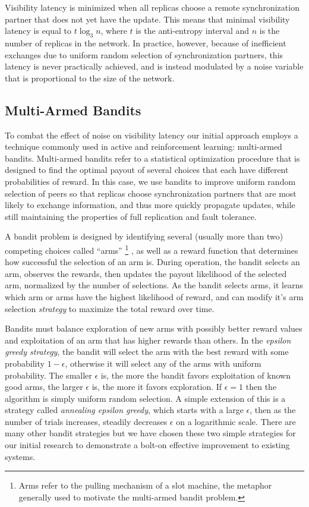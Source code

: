 Visibility latency is minimized when all replicas choose a remote
synchronization partner that does not yet have the update.
This means that minimal visibility latency is equal to $t\log_3n$, where
$t$ is the anti-entropy interval and $n$ is the number of replicas in the
network.
In practice, however, because of inefficient exchanges due to uniform random
selection of synchronization partners, this latency is never practically
achieved, and is instead modulated by a noise variable that is
proportional to the size of the network.

\subsection{Multi-Armed Bandits}

To combat the effect of noise on visibility latency our initial approach
employs a technique commonly used in active and reinforcement learning:
multi-armed bandits.
Multi-armed bandits refer to a statistical optimization procedure that is
designed to find the optimal payout of several choices that each have
different probabilities of reward.
In this case, we use bandits to improve uniform random selection of peers so
that replicas choose synchronization partners that are most likely to exchange
information, and thus more quickly propagate updates, while still maintaining
the properties of full replication and fault tolerance.

A bandit problem is designed by identifying several (usually more than two)
competing choices called ``arms''\renewcommand{\baselinestretch}{1} \small\footnotesize\footnote{Arms refer to the pulling
mechanism of a slot machine, the metaphor generally used to motivate the
multi-armed bandit problem.}\renewcommand{\baselinestretch}{2} \small\normalsize, as well as a reward function that determines how
successful the selection of an arm is.
During operation, the bandit selects an arm, observes the rewards, then
updates the payout likelihood of the selected arm, normalized by the number
of selections.
As the bandit selects arms, it learns which arm or arms have the highest
likelihood of reward, and can modify it's arm selection \emph{strategy} to
maximize the total reward over time.

Bandits must balance exploration of new arms with possibly better reward
values and exploitation of an arm that has higher rewards than others.
In the \emph{epsilon greedy strategy}, the bandit will select the arm with
the best reward with some probability $1-\epsilon$, otherwise it will select
any of the arms with uniform probability.
The smaller $\epsilon$ is, the more the bandit favors exploitation of known
good arms, the larger $\epsilon$ is, the more it favors exploration.
If $\epsilon=1$ then the algorithm is simply uniform random selection.
A simple extension of this is a strategy called \emph{annealing epsilon
greedy}, which starts with a large $\epsilon$, then as the number of trials
increases, steadily decreases $\epsilon$ on a logarithmic scale.
There are many other bandit strategies but we have chosen these two simple
strategies for our initial research to demonstrate a bolt-on effective
improvement to existing systems.

